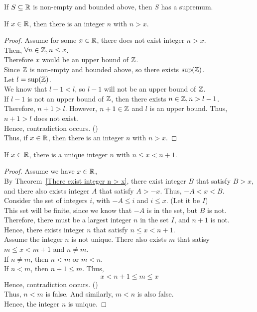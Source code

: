 \documentclass[a4paper]{article}
\begin{document}
\begin{nthm}
If $S \subseteq \mathbb{R}$ is non-empty and bounded above, then $S$ has a supremum.
\end{nthm}

\begin{nthm}\label{There exist integer n > x}
If $x \in \mathbb{R}$, then there is an integer $n$ with $n > x$.
\end{nthm}
\begin{proof}
Assume for some $x \in \mathbb{R}$, there does not exist integer $n > x$.\\
Then, $\forall n \in \mathbb{Z}, n \leq x$.\\
Therefore $x$ would be an upper bound of $\mathbb{Z}$.\\
Since $\mathbb{Z}$ is non-empty and bounded above, so there exists $\sup(\mathbb{Z})$.\\
Let $l = \sup(\mathbb{Z})$.\\
We know that $l - 1 < l$, so $l-1$ will not be an upper bound of $\mathbb{Z}$.\\
If $l-1$ is not an upper bound of $\mathbb{Z}$, then there exists $n \in \mathbb{Z}, n > l-1$.\\
Therefore, $n+1 > l$. However, $n+1 \in \mathbb{Z}$ and $l$ is an upper bound. Thus, $n+1 > l$ does not exist.\\
Hence, contradiction occurs. (\contradiction)\\
Thus, if $x \in \mathbb{R}$, then there is an integer $n$ with $n > x$.
\end{proof}

\begin{nthm}
If $x \in \mathbb{R}$, there is a unique integer $n$ with $n \leq x < n+1$.
\end{nthm}
\begin{proof}
Assume we have $x \in \mathbb{R}$,\\
By Theorem~\ref{There exist integer n > x}, there exist integer $B$ that satisfy $B > x$, and there also exists integer $A$ that satisfy $A > -x$. Thus, $-A < x < B$.\\
Consider the set of integers $i$, with $-A \leq i$ and $i \leq x$. (Let it be $I$)\\
This set will be finite, since we know that $-A$ is in the set, but $B$ is not.\\
Therefore, there must be a largest integer $n$ in the set $I$, and $n+1$ is not.\\
Hence, there exists integer $n$ that satisfy $n \leq x < n+1$.
\vspace{0.2cm}\\
Assume the integer $n$ is not unique. There also exists $m$ that satisy $m \leq x < m+1$ and $n \neq m$.\\
If $n \neq m$, then $n < m$ or $m < n$.\\
If $n < m$, then $n+1 \leq m$. Thus, $$x < n+1 \leq m \leq x$$
Hence, contradiction occurs. (\contradiction)\\
Thus, $n < m$ is false. And similarly, $m < n$ is also false.\\
Hence, the integer $n$ is unique.
\end{proof}
\end{document}
